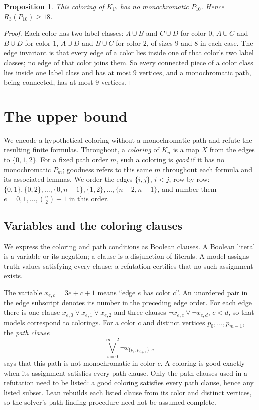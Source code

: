\documentclass[11pt]{article}
\newtheorem{proposition}[theorem]{Proposition}
\theoremstyle{definition}
\theoremstyle{remark}
\newcommand{\R}{R_3}
\begin{document}
\begin{proposition}\label{prop:lower}
This coloring of $K_{17}$ has no monochromatic $P_{10}$. Hence
$\R(P_{10})\ge 18$.
\end{proposition}

\begin{proof}
Each color has two label classes: $A\cup B$ and $C\cup D$ for color $0$,
$A\cup C$ and $B\cup D$ for color $1$, $A\cup D$ and $B\cup C$ for color
$2$, of sizes $9$ and $8$ in each case. The edge invariant is that every
edge of a color lies inside one of that color's two label classes; no edge
of that color joins them. So every connected piece of a color class lies
inside one label class and has at most $9$ vertices, and a monochromatic
path, being connected, has at most $9$ vertices.
\end{proof}

\section{The upper bound}\label{sec:encoding}
We encode a hypothetical coloring without a monochromatic path and
refute the resulting finite formulas. Throughout, a \emph{coloring} of $K_n$ is a map $X$ from the edges to
$\{0,1,2\}$. For a fixed path order $m$, such a coloring is \emph{good} if it has no
monochromatic $P_m$; goodness refers to this same $m$ throughout each
formula and its associated lemmas. We order the edges $\{i,j\}$, $i<j$, row by row:
$\{0,1\},\{0,2\},\dots,\{0,n-1\},\{1,2\},\dots,\{n-2,n-1\}$, and number
them $e=0,1,\dots,\binom n2-1$ in this order.

\subsection{Variables and the coloring clauses}
We express the coloring and path conditions as Boolean clauses.
A Boolean literal is a variable or its negation; a clause is a
disjunction of literals. A model assigns truth values satisfying every
clause; a refutation certifies that no such assignment exists.

The variable $x_{e,c}=3e+c+1$ means ``edge $e$ has color $c$''.
An unordered pair in the edge subscript denotes its number in the preceding edge order. For each
edge there is one clause $x_{e,0}\vee x_{e,1}\vee x_{e,2}$ and three
clauses $\neg x_{e,c}\vee\neg x_{e,d}$, $c<d$, so that models correspond to
colorings. For a color $c$ and distinct vertices $p_0,\dots,p_{m-1}$, the
\emph{path clause}
\[
\bigvee_{i=0}^{m-2}\neg x_{\{p_i,p_{i+1}\},c}
\]
says that this path is not monochromatic in color $c$. A coloring is good
exactly when its assignment satisfies every path clause. Only the path clauses used in a refutation need to be listed: a good
coloring satisfies every path clause, hence any listed subset. Lean
rebuilds each listed clause from its color and distinct vertices, so the
solver's path-finding procedure need not be assumed complete.
\end{document}
